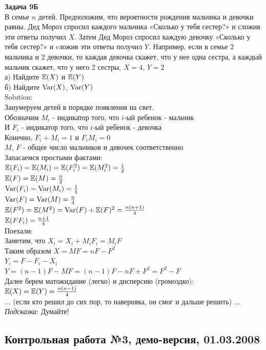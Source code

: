 \documentclass[12pt, a4paper]{article}\usepackage[]{graphicx}\usepackage[]{color}
\begin{document}
\textbf{Задача 9Б} \\
В семье $n$ детей. Предположим, что вероятности рождения мальчика и девочки равны. Дед Мороз спросил каждого мальчика «Сколько у тебя сестер?» и сложив эти ответы получил $X$. Затем Дед Мороз спросил каждую девочку «Сколько у тебя сестер?» и cложив эти ответы получил $Y$. Например, если в семье 2 мальчика и 2 девочки, то каждая девочка скажет, что у нее одна сестра, а каждый мальчик скажет, что у него 2 сестры, $X=4$, $Y=2$ \\
а) Найдите $\mathbb{E}(X)$ и $\mathbb{E}(Y)$ \\
б) Найдите $\operatorname{Var}(X)$, $\operatorname{Var}(Y)$ \\
Solution: \\
Занумеруем детей в порядке появления на свет. \\
Обозначим $M_{i}$ - индикатор того, что $i$-ый ребенок - мальчик \\
И $F_{i}$ - индикатор того, что $i$-ый ребенок - девочка \\
Конечно, $F_{i}+M_{i}=1$ и $F_{i}M_{i}=0$ \\
$M$, $F$ - общее число мальчиков и девочек соответственно \\
Запасаемся простыми фактами: \\
$\mathbb{E}(F_{i})=\mathbb{E}(M_{i})=\mathbb{E}(F_{i}^{2})=\mathbb{E}(M_{i}^{2})=\frac{1}{2}$ \\
$\mathbb{E}(F)=\mathbb{E}(M)=\frac{n}{2}$ \\
$\operatorname{Var}(F_{i})=\operatorname{Var}(M_{i})=\frac{1}{4}$ \\
$\operatorname{Var}(F)=\operatorname{Var}(M)=\frac{n}{4}$ \\
$\mathbb{E}(F^{2})=\mathbb{E}(M^{2})=\operatorname{Var}(F)+\mathbb{E}(F)^{2}=\frac{n(n+1)}{4}$ \\
$\mathbb{E}(FF_{i})=\frac{n+1}{4}$ \\
Поехали: \\
Заметим, что $X_{i}=X_{i}+M_{i}F_{i}=M_{i}F$ \\
Таким образом $X=MF=nF-F^{2}$ \\
$Y_{i}=F-F_{i}-X_{i}$ \\
$Y=(n-1)F-MF=(n-1)F-nF+F^{2}=F^{2}-F$ \\
Далее берем матожидание (легко) и дисперсию (громоздко): \\
$\mathbb{E}(X)=\mathbb{E}(Y)=\frac{n(n-1)}{4}$ \\
... (если кто решил до сих пор, то наверняка, он смог и дальше решить) ...\\


\emph{Подсказка}: Думайте! \\


\subsection{Контрольная работа №3, демо-версия, 01.03.2008}
\end{document}
